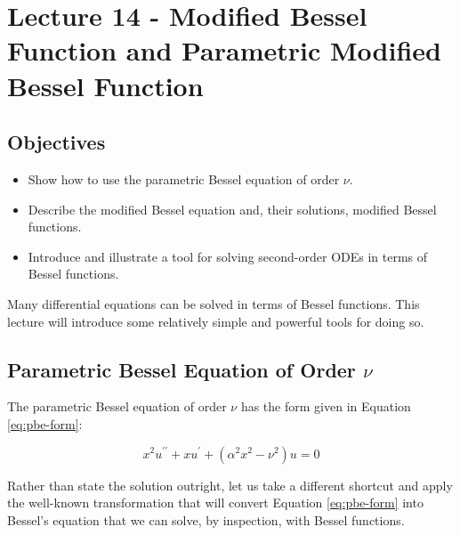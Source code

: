 \chapter{Lecture 14 - Modified Bessel Function and Parametric Modified Bessel Function}
\label{ch:lec14}
\section{Objectives}
\begin{itemize}
\item Show how to use the parametric Bessel equation of order $\nu$.
\item Describe the modified Bessel equation and, their solutions, modified Bessel functions.
\item Introduce and illustrate a tool for solving second-order ODEs in terms of Bessel functions.
\end{itemize}

Many differential equations can be solved in terms of Bessel functions.  This lecture will introduce some relatively simple and powerful tools for doing so.

\section{Parametric Bessel Equation of Order $\nu$}
The parametric Bessel equation of order $\nu$ has the form given in Equation \ref{eq:pbe-form}:

\begin{equation}
x^{2}u^{\prime \prime} + xu^{\prime} + \left(\alpha^2 x^2 - \nu^2 \right)u= 0
\label{eq:pbe-form}
\end{equation}

Rather than state the solution outright, let us take a different shortcut and apply the well-known transformation that will convert Equation \ref{eq:pbe-form} into Bessel's equation that we can solve, by inspection, with Bessel functions.

